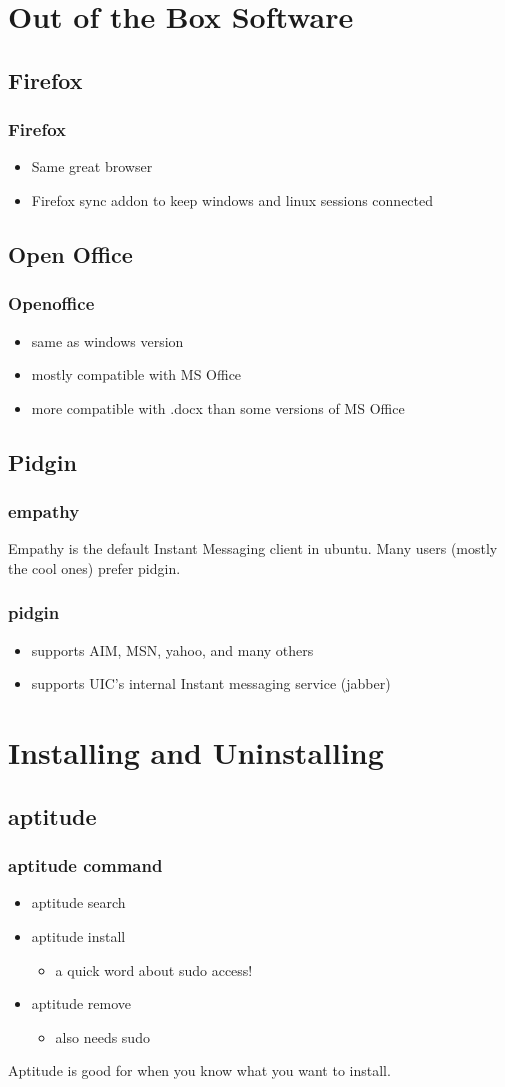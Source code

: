 \documentclass[hyperref={pdfpagelabels=false}]{beamer}
\begin{document}
\section{Out of the Box Software}
\subsection{Firefox}
\frame
{
    \frametitle{Firefox}
    \begin{itemize}
    \item{Same great browser}
    \item{Firefox sync addon to keep windows and linux sessions connected}
    \end{itemize}
}
\subsection{Open Office}
\frame
{
    \frametitle{Openoffice}
    \begin{itemize}
    \item{same as windows version}
    \item{mostly compatible with MS Office}
    \item{more compatible with .docx than some versions of MS Office}
    \end{itemize}
}
\subsection{Pidgin}
\frame
{
	\frametitle{empathy}
	Empathy is the default Instant Messaging client in ubuntu.
        Many users (mostly the cool ones) prefer pidgin.
}
\frame
{
	\frametitle{pidgin}
	\begin{itemize}
	\item{supports AIM, MSN, yahoo, and many others}
	\item{supports UIC's internal Instant messaging service (jabber)}
	\end{itemize}
}
\section{Installing and Uninstalling}
\subsection{aptitude}
\frame
{
	\frametitle{aptitude command}
	\begin{itemize}
	\item{aptitude search}
	\item{aptitude install}
		\begin{itemize}
		\item{a quick word about sudo access!}
		\end{itemize}
	\item{aptitude remove}
		\begin{itemize}
		\item{also needs sudo}
		\end{itemize}
	\end{itemize}
	Aptitude is good for when you know what you want to install.	
	
}
\end{document}
